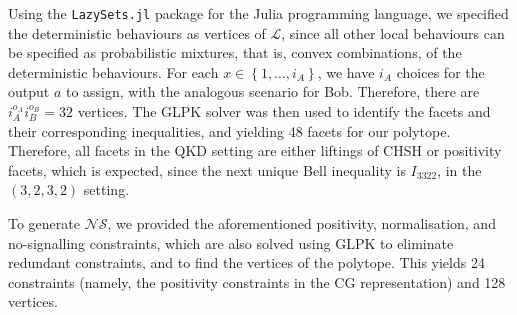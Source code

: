 \documentclass[10pt, a4paper]{article}
\numberwithin{equation}{section} %
\theoremstyle{definition}
\theoremstyle{plain}
\newcommand{\dintv}[2]{\left\{#1,\ldots,#2\right\}}
\newcommand{\?}{\mathrel{?}} %
\newcommand{\Ls}{\mathcal{L}}
\newcommand{\NSs}{\mathcal{NS}}
\begin{document}
      Using the \verb`LazySets.jl` package for the Julia programming language, we specified the deterministic behaviours as vertices of \(\Ls\), since all other local behaviours can be specified as probabilistic mixtures, that is, convex combinations, of the deterministic behaviours. For each \(x \in \dintv{1}{i_A}\), we have \(i_A\) choices for the output \(a\) to assign, with the analogous scenario for Bob. Therefore, there are \(i_A^{o_A}i_B^{o_B} = 32\) vertices. The GLPK solver was then used to identify the facets and their corresponding inequalities, and yielding 48 facets for our polytope. Therefore, all facets in the QKD setting are either liftings of CHSH or positivity facets, which is expected, since the next unique Bell inequality is \(I_{3322}\), in the \((3,2,3,2)\) setting.

      To generate \(\NSs\), we provided the aforementioned positivity, normalisation, and no-signalling constraints, which are also solved using GLPK to eliminate redundant constraints, and to find the vertices of the polytope. This yields 24 constraints (namely, the positivity constraints in the CG representation) and 128 vertices.
\end{document}
